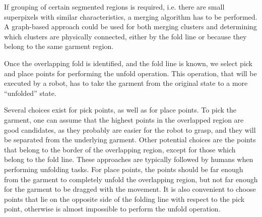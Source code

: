 If grouping of certain segmented regions is required, i.e. there are small superpixels with similar characteristics, a merging algorithm has to be performed. A graph-based approach could be used for both merging clusters and determining which clusters are physically connected, either by the fold line or because they belong to the same garment region.


Once the overlapping fold is identified, and the fold line is known, we select pick and place points for performing the unfold operation. This operation, that will be executed by a robot, has to take the garment from the original state to a more ``unfolded'' state.

Several choices exist for pick points, as well as for place points. To pick the garment, one can assume that the highest points in the overlapped region are good candidates, as they probably are easier for the robot to grasp, and they will be separated from the underlying garment. Other potential choices are the points that belong to the border of the overlapping region, except for those which belong to the fold line. These approaches are typically followed by humans when performing unfolding tasks. For place points, the points should be far enough from the garment to completely unfold the overlapping region, but not far enough for the garment to be dragged with the movement. It is also convenient to choose points that lie on the opposite side of the folding line with respect to the pick point, otherwise is almost impossible to perform the unfold operation.